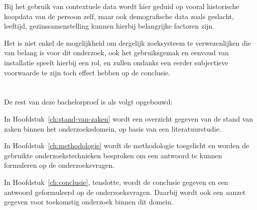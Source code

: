 Bij het gebruik van contextuele data wordt hier geduid op vooral historische koopdata van de persoon zelf, maar ook demografische data zoals geslacht, leeftijd, gezinssamenstelling kunnen hierbij belangrijke factoren zijn. 

Het is niet enkel de mogelijkheid om dergelijk zoeksysteem te verwezenlijken die van belang is voor dit onderzoek, ook het gebruiksgemak en eenvoud van installatie speelt hierbij een rol, en zullen ondanks een eerder subjectieve voorwaarde te zijn toch effect hebben op de conclusie.

\section{}
\label{sec:opzet-bachelorproef}


De rest van deze bachelorproef is als volgt opgebouwd:

In Hoofdstuk~\ref{ch:stand-van-zaken} wordt een overzicht gegeven van de stand van zaken binnen het onderzoeksdomein, op basis van een literatuurstudie.

In Hoofdstuk~\ref{ch:methodologie} wordt de methodologie toegelicht en worden de gebruikte onderzoekstechnieken besproken om een antwoord te kunnen formuleren op de onderzoeksvragen.


In Hoofdstuk~\ref{ch:conclusie}, tenslotte, wordt de conclusie gegeven en een antwoord geformuleerd op de onderzoeksvragen. Daarbij wordt ook een aanzet gegeven voor toekomstig onderzoek binnen dit domein.